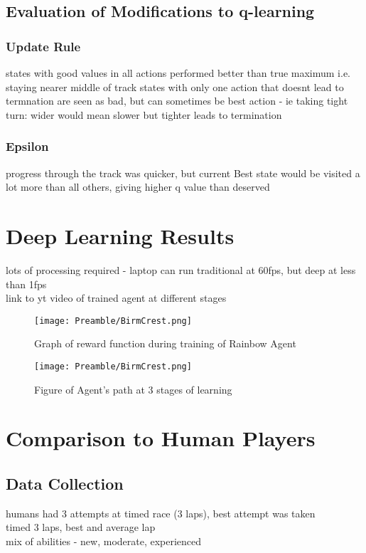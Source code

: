 \subsection{Evaluation of Modifications to q-learning}
\subsubsection{Update Rule}
states with good values in all actions performed better than true maximum i.e. staying nearer middle of track
states with only one action that doesnt lead to termnation are seen as bad, but can sometimes be best action - ie taking tight turn: wider would mean slower but tighter leads to termination

\subsubsection{Epsilon}
progress through the track was quicker, but current Best state would be visited a lot more than all others, giving higher q value than deserved

\section{Deep Learning Results}
lots of processing required - laptop can run traditional at 60fps, but deep at less than 1fps\\
link to yt video of trained agent at different stages
\begin{figure}
    \centering
    \texttt{[image: Preamble/BirmCrest.png]}
    \caption{Graph of reward function during training of Rainbow Agent}
    \label{fig:trainig-reward-deep}
\end{figure}

\begin{figure}
    \centering
    \texttt{[image: Preamble/BirmCrest.png]}
    \caption{Figure of Agent's path at 3 stages of learning}
    \label{fig:agent-path-q}
\end{figure}

\section{Comparison to Human Players}
\subsection{Data Collection}
humans had 3 attempts at timed race (3 laps), best attempt was taken\\ timed 3 laps, best and average lap
\\ mix of abilities - new, moderate, experienced

